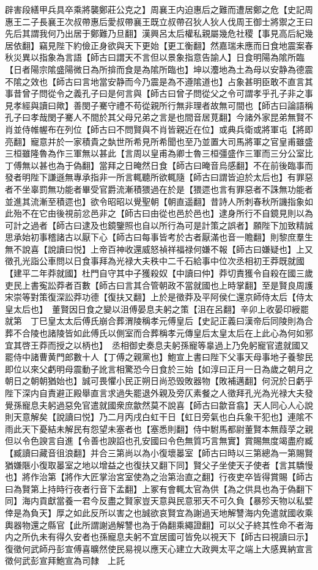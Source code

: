 辟害段繕甲兵具卒乘將襲鄭莊公克之】周襄王内迫惠后之難而遭居鄭之危【史記周惠王二子長襄王次叔帶惠后愛叔帶襄王既立叔帶召狄人狄人伐周王御士將禦之王曰先后其謂我何乃出居于鄭難乃旦翻】漢興呂太后權私親屬幾危社稷【事見高后紀幾居依翻】竊見陛下約儉正身欲與天下更始【更工衡翻】然嘉瑞未應而日食地震案春秋災異以指象為言語【師古曰謂天不言但以景象指意告諭人】日食明陽為隂所臨【日者陽宗隂盛陽微日為所揜而食是為隂所臨也】坤以灋地為土為母以安静為德震不隂之效也【師古曰言地當安静而今乃震是為不遵隂道也】占象甚明臣敢不直言其事昔曾子問從令之義孔子曰是何言與【師古曰曾子問從父之令可謂孝乎孔子非之事見孝經與讀曰歟】善閔子騫守禮不苟從親所行無非理者故無可間也【師古曰論語稱孔子曰孝哉閔子騫人不間於其父母兄弟之言是也間音居莧翻】今諸外家昆弟無賢不肖並侍帷幄布在列位【師古曰不問賢與不肖皆親近在位】或典兵衛或將軍屯【將即亮翻】寵意并於一家積貴之埶世所希見所希聞也至乃並置大司馬將軍之官皇甫雖盛三桓雖隆魯為作三軍無以甚此【言周以皇甫為卿士魯三桓彊盛作三軍而三分公室比丁傅無以甚也為于偽翻】當拜之日晻然日食【師古曰晻音烏感翻】不在前後臨事而發者明陛下謙遜無專承指非一所言輒聽所欲輒隨【師古曰謂皆迫於太后也】有罪惡者不坐辜罰無功能者畢受官爵流漸積猥過在於是【猥遝也言有罪惡者不誅無功能者並進其流漸至積遝也】欲令昭昭以覺聖朝【朝直遥翻】昔詩人所刺春秋所譏指象如此殆不在它由後視前忿邑非之【師古曰由從也邑於邑也】逮身所行不自鏡見則以為可計之過者【師古曰逮及也鏡鑒照也自以所行為可是計策之誤者】願陛下加致精誠思承始初事稽諸古以厭下心【師古曰每事皆考於古者厭滿也音一贍翻】則黎庶羣生無不說喜【說讀曰悦】上帝百神收還威怒禎祥福禄何嫌不報【師古曰嫌疑也】上又徵孔光詣公車問以日食事拜為光禄大夫秩中二千石給事中位次丞相初王莽既就國【建平二年莽就國】杜門自守其中子獲殺奴【中讀曰仲】莽切責獲令自殺在國三歲吏民上書寃訟莽者百數【師古曰言其合管朝政不當就國也上時掌翻】至是賢良周護宋崇等對策復深訟莽功德【復扶又翻】上於是徵莽及平阿侯仁還京師侍太后【侍太皇太后也】　董賢因日食之變以沮傅晏息夫躬之策【沮在呂翻】辛卯上收晏印綬罷就第　丁巳皇太太后傅氏崩合葬渭陵稱孝元傅皇后【史記正義曰漢帝后同陵則為合葬不合陵也諸陵皆如此傅氏以側室而合葬稱孝元傳皇后太皇太后在上此心為何如邪宜其啓王莽而授之以柄也】　丞相御史奏息夫躬孫寵等辠過上乃免躬寵官遣就國又罷侍中諸曹黄門郎數十人【丁傅之親黨也】鮑宣上書曰陛下父事天母事地子養黎民即位以來父虧明母震動子訛言相驚恐今日食於三始【如淳曰正月一日為歲之朝月之朝日之朝朝猶始也】誠可畏懼小民正朔日尚恐毁敗器物【敗補邁翻】何況於日虧乎陛下深内自責避正殿舉直言求過失罷退外親及旁仄素餐之人徵拜孔光為光禄大夫發覺孫寵息夫躬過惡免官遣就國衆庶歙然莫不說喜【師古曰歙音翕】天人同心人心說則天意解矣【說讀曰悦】乃二月丙戌白虹干日【虹日旁氣也白兵象干犯也】連隂不雨此天下憂結未解民有怨望未塞者也【塞悉則翻】侍中駙馬都尉董賢本無葭莩之親但以令色諛言自進【令善也諛諂也孔安國曰令色無質巧言無實】賞賜無度竭盡府臧【臧讀曰藏音徂浪翻】并合三第尚以為小復壞㬥室【師古曰時以三第總為一第賜賢猶嫌陿小復取㬥室之地以增益之也復扶又翻下同】賢父子坐使天子使者【言其驕慢也】將作治第【將作大匠掌治宮室使為之治第治直之翻】行夜吏卒皆得賞賜【師古曰為賢第上持時行夜者行音下孟翻】上冢有會輒太官為供【為之供具也為于偽翻下同】海内貢獻當養一君今反盡之賢家豈天意與民意邪天不可久負【暴殄天物以私嬖倖是為負天】厚之如此反所以害之也誠欲哀賢宜為謝過天地解讐海内免遣就國收乘輿器物還之縣官【此所謂謝過解讐也為于偽翻乘繩證翻】可以父子終其性命不者海内之所仇未有得久安者也孫寵息夫躬不宜居國可皆免以視天下【師古曰視讀曰示】復徵何武師丹彭宣傅喜曠然使民易視以應天心建立大政興太平之端上大感異納宣言徵何武彭宣拜鮑宣為司隸　上託